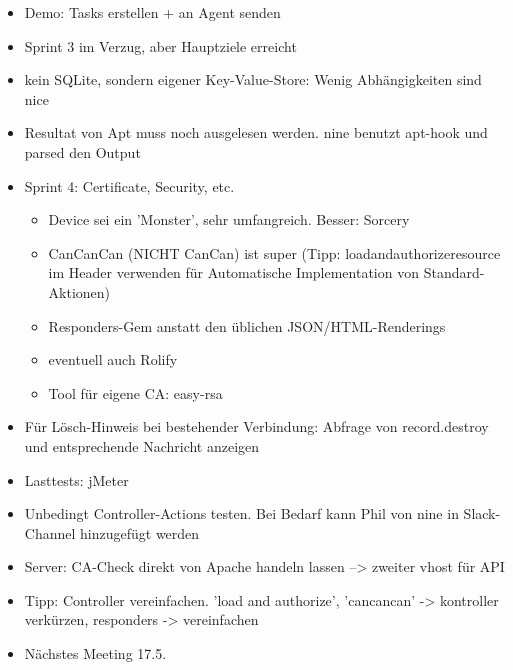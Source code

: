 \documentclass[class=scrbook,crop=false]{standalone}
\begin{document}
	\begin{itemize}
        \item Demo: Tasks erstellen + an Agent senden
        \item Sprint 3 im Verzug, aber Hauptziele erreicht
        \item kein SQLite, sondern eigener Key-Value-Store: Wenig Abhängigkeiten sind nice
        \item Resultat von Apt muss noch ausgelesen werden. \gls{nine} benutzt apt-hook und parsed den Output
        \item Sprint 4: Certificate, Security, etc.
        \begin{itemize}
            \item Device sei ein 'Monster', sehr umfangreich. Besser: Sorcery
            \item CanCanCan (NICHT CanCan) ist super (Tipp: load\textunderscore and\textunderscore authorize\textunderscore resource im Header verwenden für Automatische Implementation von Standard-Aktionen)
            \item Responders-Gem anstatt den üblichen JSON/HTML-Renderings
            \item eventuell auch Rolify
            \item Tool für eigene CA: easy-rsa
        \end{itemize}
        \item Für Lösch-Hinweis bei bestehender Verbindung: Abfrage von record.destroy und entsprechende Nachricht anzeigen
        \item Lasttests: jMeter
        \item Unbedingt Controller-Actions testen. Bei Bedarf kann Phil von \gls{nine} in Slack-Channel hinzugefügt werden
        \item Server: CA-Check direkt von Apache handeln lassen --> zweiter vhost für API
        \item Tipp: Controller vereinfachen. 'load and authorize', 'cancancan' -> kontroller verkürzen, responders -> vereinfachen
        \item Nächstes Meeting 17.5.
    \end{itemize}
    
\end{document}
